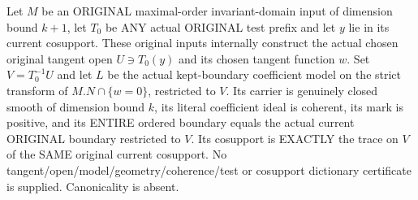 \begin{theorem}
\label{hir:original-noncanonical-chosen-contact-geometric-presentation}
\leanok
Let $M$ be an ORIGINAL maximal-order invariant-domain input of dimension
bound $k+1$, let $T_0$ be ANY actual ORIGINAL test prefix and let $y$ lie
in its current cosupport. These original inputs internally construct the
actual chosen original tangent open $U\ni T_0(y)$ and its chosen tangent
function $w$. Set $V=T_0^{-1}U$ and let $L$ be the actual kept-boundary
coefficient model on the strict transform of $M.N\cap\{w=0\}$, restricted
to $V$. Its carrier is genuinely closed smooth of dimension bound $k$,
its literal coefficient ideal is coherent, its mark is positive, and its
ENTIRE ordered boundary equals the actual current ORIGINAL boundary
restricted to $V$. Its cosupport is EXACTLY the trace on $V$ of the SAME
original current cosupport. No tangent/open/model/geometry/coherence/test
or cosupport dictionary certificate is supplied. Canonicality is absent.
\end{theorem}
